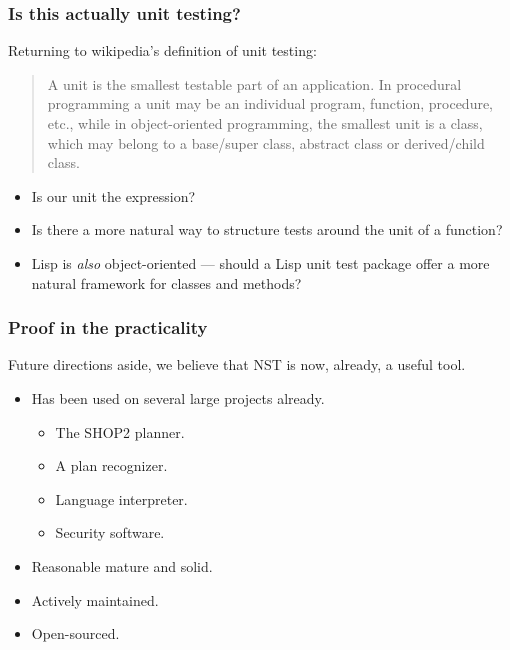 \documentclass{beamer}
\begin{document}
\begin{frame}
  \frametitle{Is this actually unit testing?}
  
  Returning to wikipedia's definition of unit testing:
  \begin{quotation}\noindent\small
    A unit is the smallest testable part of an application. In
    procedural programming a unit may be an individual program,
    function, procedure, etc., while in object-oriented programming,
    the smallest unit is a class, which may belong to a base/super
    class, abstract class or derived/child class.
  \end{quotation}\vspace{-2em}
  \begin{itemize}
  \item Is our unit the expression?
  \item Is there a more natural way to structure tests around the unit
    of a function?
  \item Lisp is \emph{also} object-oriented --- should a Lisp unit
    test package offer a more natural framework for classes and
    methods?
  \end{itemize}
\end{frame}

\begin{frame}
  \frametitle{Proof in the practicality}
  
  Future directions aside, we believe that NST is now, already, a
  useful tool.
  \begin{itemize}
  \item Has been used on several large projects already.
    \begin{itemize}
    \item The SHOP2 planner.
    \item A plan recognizer.
    \item Language interpreter.
    \item Security software.
    \end{itemize}
  \item Reasonable mature and solid.
  \item Actively maintained.
  \item Open-sourced.
  \end{itemize}
\end{frame}
\end{document}
